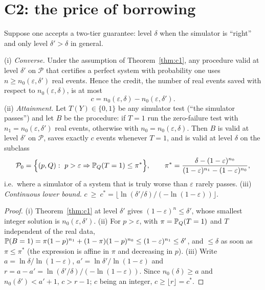 \section{C2: the price of borrowing}

Suppose one accepts a two-tier guarantee: level $\delta$ when the simulator is ``right'' and only level
$\delta'>\delta$ in general.

\begin{theorem}\label{thm:c2}
(i) \emph{Converse.} Under the assumption of Theorem~\ref{thm:c1}, any procedure valid at level $\delta'$ on
$\mathcal{P}$ that certifies a perfect system with probability one uses $n\ge n_0(\varepsilon,\delta')$ real events.
Hence the credit, the number of real events saved with respect to $n_0(\varepsilon,\delta)$, is at most
\[c=n_0(\varepsilon,\delta)-n_0(\varepsilon,\delta').\]
(ii) \emph{Attainment.} Let $T(Y)\in\{0,1\}$ be any simulator test (``the simulator passes'') and let $B$ be the
procedure: if $T=1$ run the zero-failure test with $n_1=n_0(\varepsilon,\delta')$ real events, otherwise with
$n_0=n_0(\varepsilon,\delta)$. Then $B$ is valid at level $\delta'$ on $\mathcal{P}$, saves exactly $c$ events
whenever $T=1$, and is valid at level $\delta$ on the subclass
\[\mathcal{P}_0=\Bigl\{(p,Q):\ p>\varepsilon\Rightarrow \PP_Q(T=1)\le\pi^\ast\Bigr\},\qquad
\pi^\ast=\frac{\delta-(1-\varepsilon)^{n_0}}{(1-\varepsilon)^{n_1}-(1-\varepsilon)^{n_0}},\]
i.e.\ where a simulator of a system that is truly worse than $\varepsilon$ rarely passes.
(iii) \emph{Continuous lower bound.} $c\ \ge\ c^\ast=\bigl\lfloor \ln(\delta'/\delta)/(-\ln(1-\varepsilon))\bigr\rfloor$.
\end{theorem}

\begin{proof}
(i) Theorem~\ref{thm:c1} at level $\delta'$ gives $(1-\varepsilon)^n\le\delta'$, whose smallest integer solution is
$n_0(\varepsilon,\delta')$. (ii) For $p>\varepsilon$, with $\pi=\mathbb{P}_Q(T=1)$ and $T$ independent of the real data,
$\mathbb{P}(B=1)=\pi(1-p)^{n_1}+(1-\pi)(1-p)^{n_0}\le(1-\varepsilon)^{n_1}\le\delta'$, and $\le\delta$ as soon as
$\pi\le\pi^\ast$ (the expression is affine in $\pi$ and decreasing in $p$). (iii) Write $a=\ln\delta/\ln(1-\varepsilon)$,
$a'=\ln\delta'/\ln(1-\varepsilon)$ and $r=a-a'=\ln(\delta'/\delta)/(-\ln(1-\varepsilon))$. Since $n_0(\delta)\ge a$ and
$n_0(\delta')<a'+1$, $c>r-1$; $c$ being an integer, $c\ge\lfloor r\rfloor=c^\ast$.
\end{proof}

